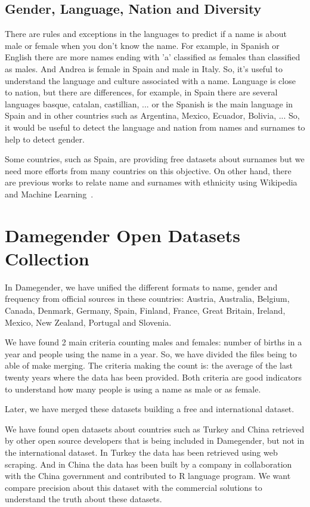 \documentclass[a4paper]{article}
\begin{document}
\subsection{Gender, Language, Nation and Diversity}
\label{sec:diversity}

There are rules and exceptions in the languages to predict if a name
is about male or female when you don't know the name. For example, in
Spanish or English there are more names ending with 'a' classified as
females than classified as males. And Andrea is female in Spain and
male in Italy. So, it's useful to understand the language and culture
associated with a name. Language is close to nation, but there are
differences, for example, in Spain there are several languages basque,
catalan, castillian, ... or the Spanish is the main language in Spain
and in other countries such as Argentina, Mexico, Ecuador, Bolivia,
... So, it would be useful to detect the language and nation from
names and surnames to help to detect gender.

Some countries, such as Spain, are providing free datasets about
surnames but we need more efforts from many countries on this
objective. On other hand, there are previous works to relate name and
surnames with ethnicity using Wikipedia and Machine
Learning~\cite{ambekar2009name}.

\section{Damegender Open Datasets Collection}
\label{sec:damegender}

In Damegender, we have unified the different formats to name, gender
and frequency from official sources in these countries: Austria,
Australia, Belgium, Canada, Denmark, Germany, Spain, Finland, France,
Great Britain, Ireland, Mexico, New Zealand, Portugal and Slovenia.

We have found 2 main criteria counting males and females: number of
births in a year and people using the name in a year. So, we have
divided the files being to able of make merging. The criteria making
the count is: the average of the last twenty years where the data has
been provided. Both criteria are good indicators to understand how
many people is using a name as male or as female.

Later, we have merged these datasets building a free and international
dataset.

We have found open datasets about countries such as Turkey and China
retrieved by other open source developers that is being included in
Damegender, but not in the international dataset. In Turkey the data
has been retrieved using web scraping. And in China the data has been
built by a company in collaboration with the China government and
contributed to R language program. We want compare precision about
this dataset with the commercial solutions to understand the truth
about these datasets.
\end{document}

